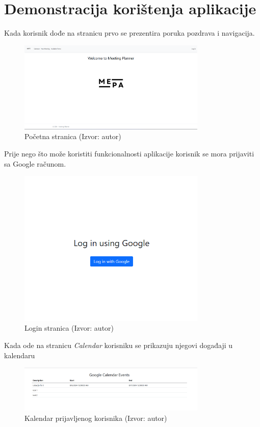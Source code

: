 \documentclass{foi}
\begin{document}
\section{Demonstracija korištenja aplikacije}
Kada korisnik dođe na stranicu prvo se prezentira poruka pozdrava i navigacija.
\begin{figure}[H]
    \centering
    \includegraphics[width=0.8\textwidth]{slike/appUsage1.png}
    \caption{Početna stranica (Izvor: autor)}
    \label{fig:startPageUI}
\end{figure}
Prije nego što može koristiti funkcionalnosti aplikacije korisnik se mora prijaviti sa Google računom.
\begin{figure}[H]
    \centering
    \includegraphics[width=0.8\textwidth]{slike/appUsage2.png}
    \caption{Login stranica (Izvor: autor)}
    \label{fig:loginUI}
\end{figure}
Kada ode na stranicu \textit{Calendar} korisniku se prikazuju njegovi događaji u kalendaru
\begin{figure}[H]
    \centering
    \includegraphics[width=0.8\textwidth]{slike/appUsage3.png}
    \caption{Kalendar prijavljenog korisnika (Izvor: autor)}
    \label{fig:userCalendarUI}
\end{figure}
\end{document}
